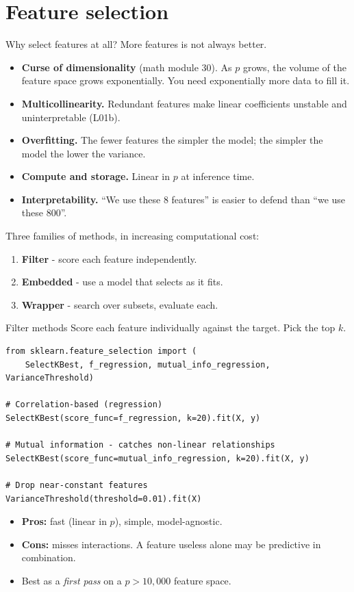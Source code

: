 \documentclass[aspectratio=169]{beamer}
\begin{document}
\section{Feature selection}

\begin{frame}{Why select features at all?}
  More features is not always better.
  \vfill
  \begin{itemize}
    \item \textbf{Curse of dimensionality} (math module 30). As $p$ grows, the volume of the feature space grows exponentially. You need exponentially more data to fill it.
    \item \textbf{Multicollinearity.} Redundant features make linear coefficients unstable and uninterpretable (L01b).
    \item \textbf{Overfitting.} The fewer features the simpler the model; the simpler the model the lower the variance.
    \item \textbf{Compute and storage.} Linear in $p$ at inference time.
    \item \textbf{Interpretability.} ``We use these 8 features'' is easier to defend than ``we use these 800''.
  \end{itemize}
  \vfill
  Three families of methods, in increasing computational cost:
  \begin{enumerate}\small
    \item \textbf{Filter} - score each feature independently.
    \item \textbf{Embedded} - use a model that selects as it fits.
    \item \textbf{Wrapper} - search over subsets, evaluate each.
  \end{enumerate}
\end{frame}

\begin{frame}[fragile]{Filter methods}
  Score each feature individually against the target. Pick the top $k$.
  \vfill
{\lstset{basicstyle=\ttfamily\scriptsize}
\begin{lstlisting}
from sklearn.feature_selection import (
    SelectKBest, f_regression, mutual_info_regression, VarianceThreshold)

# Correlation-based (regression)
SelectKBest(score_func=f_regression, k=20).fit(X, y)

# Mutual information - catches non-linear relationships
SelectKBest(score_func=mutual_info_regression, k=20).fit(X, y)

# Drop near-constant features
VarianceThreshold(threshold=0.01).fit(X)
\end{lstlisting}}
  \vfill
  \begin{itemize}\small
    \item \textbf{Pros:} fast (linear in $p$), simple, model-agnostic.
    \item \textbf{Cons:} misses interactions. A feature useless alone may be predictive in combination.
    \item Best as a \emph{first pass} on a $p > 10{,}000$ feature space.
  \end{itemize}
\end{frame}
\end{document}
